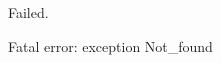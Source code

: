 \runverbatimfalse
{}
\begin{RunVerbatimMsg}
Failed.
\end{RunVerbatimMsg}
\begin{RunVerbatimErr}
Fatal error: exception Not_found
\end{RunVerbatimErr}
